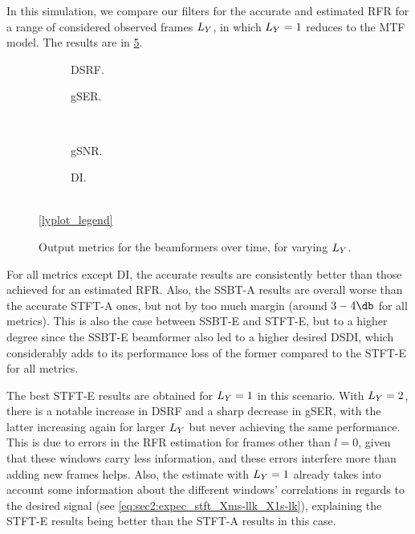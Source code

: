 In this simulation, we compare our filters for the accurate and estimated RFR for a range of considered observed frames $\Ly$, in which $\Ly = 1$ reduces to the MTF model. The results are in \cref{fig:lineplot__iSER_n15__Ly_var}.
\begin{figure}[!t]
	\centering
	\begin{subfigure}{0.49\textwidth}
		\centering
		
		\caption{DSRF.}
		\label{subfig:lineplot__DSRF__iSER_n15__Ly_var}
	\end{subfigure}\hfill
	\begin{subfigure}{0.49\textwidth}
		\centering
		
		\caption{gSER.}
		\label{subfig:lineplot__gSER__iSER_n15__Ly_var}
	\end{subfigure}\\[1em]
	\begin{subfigure}{0.49\textwidth}
		\centering
		
		\caption{gSNR.}
		\label{subfig:lineplot__gSNR__iSER_n15__Ly_var}
	\end{subfigure}\hfill
	\begin{subfigure}{0.49\textwidth}
		\centering
		
		\caption{DI.}
		\label{subfig:lineplot__DI__iSER_n15__Ly_var}
	\end{subfigure}\\[1em]
	\ref*{lyplot_legend}
	\caption{Output metrics for the beamformers over time, for varying $\Ly$.}
	\label{fig:lineplot__iSER_n15__Ly_var}
\end{figure}
For all metrics except DI, the accurate results are consistently better than those achieved for an estimated RFR. Also, the SSBT-A results are overall worse than the accurate STFT-A ones, but not by too much margin (around $3-4\dB$ for all metrics). This is also the case between SSBT-E and STFT-E, but to a higher degree since the SSBT-E beamformer also led to a higher desired DSDI, which considerably adds to its performance loss of the former compared to the STFT-E for all metrics.

The best STFT-E results are obtained for $\Ly = 1$ in this scenario. With $\Ly = 2$, there is a notable increase in DSRF and a sharp decrease in gSER, with the latter increasing again for larger $\Ly$ but never achieving the same performance. This is due to errors in the RFR estimation for frames other than $l = 0$, given that these windows carry less information, and these errors interfere more than adding new frames helps. Also, the estimate with $\Ly = 1$ already takes into account some information about the different windows' correlations in regards to the desired signal (see \cref{eq:sec2:expec_stft_Xms-llk_X1s-lk}), explaining the STFT-E results being better than the STFT-A results in this case.

